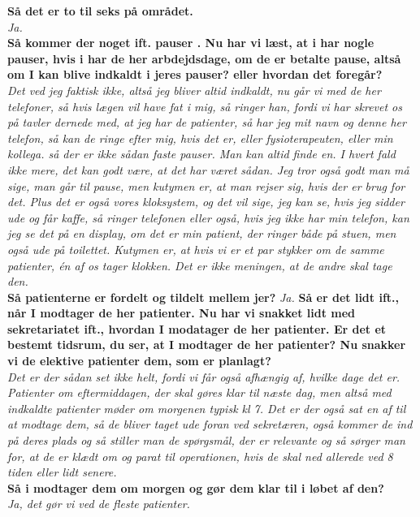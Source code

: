 \textbf{Så det er to til seks på området.}\\
\noindent
\textit{Ja.}\\
\noindent
\textbf{Så kommer der noget ift. pauser . Nu har vi læst, at i har nogle pauser, hvis i har de her arbdejdsdage, om de er betalte pause, altså om I kan blive indkaldt i jeres pauser? eller hvordan det foregår?}\\
\noindent
\textit{Det ved jeg faktisk ikke, altså jeg bliver altid indkaldt, nu går vi med de her telefoner, så hvis lægen vil have fat i mig, så ringer han, fordi vi har skrevet os på tavler dernede med, at jeg har de patienter, så har jeg mit navn og denne her telefon, så kan de ringe efter mig, hvis det er, eller fysioterapeuten, eller min kollega. så der er ikke sådan faste pauser. Man kan altid finde en. I hvert fald ikke mere, det kan godt være, at det har været sådan. Jeg tror også godt man må sige, man går til pause, men kutymen er, at man rejser sig, hvis der er brug for det. Plus det er også vores kloksystem, og det vil sige, jeg kan se, hvis jeg sidder ude og får kaffe, så ringer telefonen eller også, hvis jeg ikke har min telefon, kan jeg se det på en display, om det er min patient, der ringer både på stuen, men også ude på toilettet. Kutymen er, at hvis vi er et par stykker om de samme patienter, én af os tager klokken. Det er ikke meningen, at de andre skal tage den.}\\
\noindent
\textbf{Så patienterne er fordelt og tildelt mellem jer?}
\noindent
\textit{Ja.}
\noindent
\textbf{Så er det lidt ift., når I modtager de her patienter. Nu har vi snakket lidt med sekretariatet ift., hvordan I modatager de her patienter. Er det et bestemt tidsrum, du ser, at I modtager de her patienter? Nu snakker vi de elektive patienter dem, som er planlagt?}\\
\noindent
\textit{Det er der sådan set ikke helt, fordi vi får også afhængig af, hvilke dage det er. Patienter om eftermiddagen, der skal gøres klar til næste dag, men altså med indkaldte patienter møder om morgenen typisk kl 7. Det er der også sat en af til at modtage dem, så de bliver taget ude foran ved sekretæren, også kommer de ind på deres plads og så stiller man de spørgsmål, der er relevante og så sørger man for, at de er klædt om og parat til operationen, hvis de skal ned allerede ved 8 tiden eller lidt senere.}\\
\noindent
\textbf{Så i modtager dem om morgen og gør dem klar til i løbet af den?}\\
\noindent
\textit{Ja, det gør vi ved de fleste patienter.}\\
